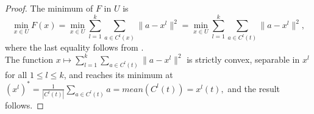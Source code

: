 \documentclass[11pt]{article}
\numberwithin{equation}{section}
\begin{document}
\begin{proof}
The minimum of $F$ in $U$ is
\begin{equation*}
\min\limits_{x \in U} F(x) = \min\limits_{x \in U} \sum\limits_{l=1}^{k} \sum\limits_{a \in C^l(x)} \|a - x^l \|^2 = \min\limits_{x \in U} \sum\limits_{l=1}^{k} \sum\limits_{a \in C^l(t)} \|a - x^l \|^2 ,
\end{equation*}
where the last equality follows from .\\
The function $x \mapsto \sum\limits_{l=1}^{k} \sum\limits_{a \in C^l(t)} \|a - x^l \|^2$ is strictly convex, separable in $x^l$ for all $1 \leq l \leq k$, and reaches its minimum at $\left( x^l \right)^{*} = \frac{1}{\left| C^l(t) \right|} \sum\limits_{a \in C^l(t)} a = mean(C^l(t)) = x^l(t),$ and the result follows.
\end{proof}
\end{document}
